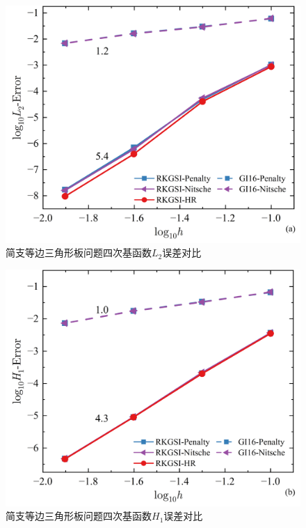 \begin{figure}[H]
    \centering
    \includegraphics[scale=0.5]{figure/PHR/T/QL2.png}
    \caption{简支等边三角形板问题四次基函数$L_2$误差对比}
\end{figure}
\begin{figure}[H]
    \centering
    \includegraphics[scale=0.5]{figure/PHR/T/QH1.png}
    \caption{简支等边三角形板问题四次基函数$H_1$误差对比}
\end{figure}
\newpage
